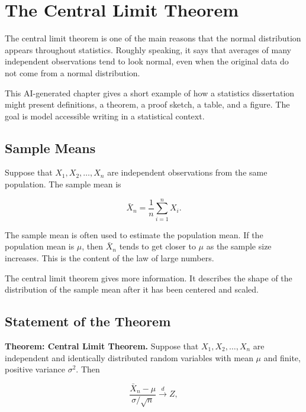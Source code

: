 \chapter{The Central Limit Theorem}
\label{chap-three}

The central limit theorem is one of the main reasons that the normal distribution appears throughout statistics. Roughly speaking, it says that averages of many independent observations tend to look normal, even when the original data do not come from a normal distribution.

This AI-generated chapter gives a short example of how a statistics dissertation might present definitions, a theorem, a proof sketch, a table, and a figure. The goal is model accessible writing in a statistical context.

\section{Sample Means}
\label{sec:sample-means}

Suppose that \(X_1, X_2, \ldots, X_n\) are independent observations from the same population. The sample mean is

\begin{equation}
\bar{X}_n = \frac{1}{n}\sum_{i=1}^{n} X_i.
\label{eq:sample-mean}
\end{equation}

The sample mean is often used to estimate the population mean. If the population mean is \(\mu\), then \(\bar{X}_n\) tends to get closer to \(\mu\) as the sample size increases. This is the content of the law of large numbers.

The central limit theorem gives more information. It describes the shape of the distribution of the sample mean after it has been centered and scaled.

\section{Statement of the Theorem}
\label{sec:clt-statement}

\noindent\textbf{Theorem: Central Limit Theorem.}
Suppose that \(X_1, X_2, \ldots, X_n\) are independent and identically distributed random variables with mean \(\mu\) and finite, positive variance \(\sigma^2\). Then

\begin{equation}
\frac{\bar{X}_n-\mu}{\sigma/\sqrt{n}}
\xrightarrow{d} Z,
\label{eq:clt}
\end{equation}

